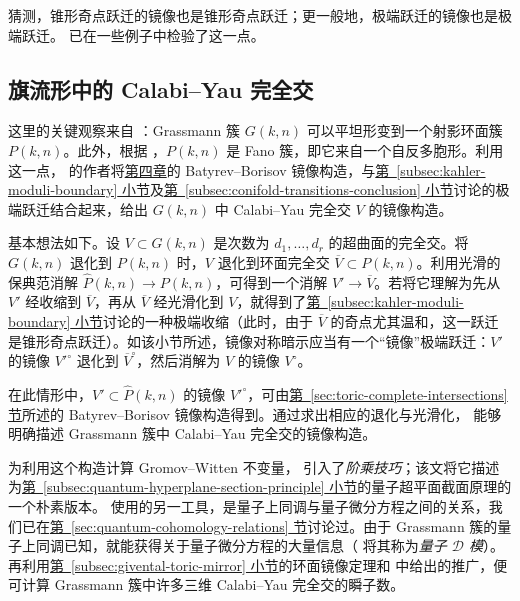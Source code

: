  猜测，锥形奇点跃迁的镜像也是锥形奇点跃迁；更一般地，极端跃迁的镜像也是极端跃迁。 已在一些例子中检验了这一点。

\subsection{旗流形中的 Calabi--Yau 完全交}\label{subsec:flag-cy-complete-intersections}
这里的关键观察来自 ：Grassmann 簇 $G(k,n)$ 可以平坦形变到一个射影环面簇 $P(k,n)$。此外，根据 ，$P(k,n)$ 是 Fano 簇，即它来自一个自反多胞形。利用这一点， 的作者将\hyperref[chap:mirror-constructions]{第四章}的 Batyrev--Borisov 镜像构造，与\hyperref[subsec:kahler-moduli-boundary]{第~\ref*{subsec:kahler-moduli-boundary} 小节}及\hyperref[subsec:conifold-transitions-conclusion]{第~\ref*{subsec:conifold-transitions-conclusion} 小节}讨论的极端跃迁结合起来，给出 $G(k,n)$ 中 Calabi--Yau 完全交 $V$ 的镜像构造。

基本想法如下。设 $V\subset G(k,n)$ 是次数为 $d_1,\ldots,d_r$ 的超曲面的完全交。将 $G(k,n)$ 退化到 $P(k,n)$ 时，$V$ 退化到环面完全交 $\overline V\subset P(k,n)$。利用光滑的保典范消解 $\widehat P(k,n)\to P(k,n)$，可得到一个消解 $V'\to\overline V$。若将它理解为先从 $V'$ 经收缩到 $\overline V$，再从 $\overline V$ 经光滑化到 $V$，就得到了\hyperref[subsec:kahler-moduli-boundary]{第~\ref*{subsec:kahler-moduli-boundary} 小节}讨论的一种极端收缩（此时，由于 $\overline V$ 的奇点尤其温和，这一跃迁是锥形奇点跃迁）。如该小节所述，镜像对称暗示应当有一个“镜像”极端跃迁：$V'$ 的镜像 $V'^\circ$ 退化到 $\overline V^\circ$，然后消解为 $V$ 的镜像 $V^\circ$。

在此情形中，$V'\subset\widehat P(k,n)$ 的镜像 $V'^\circ$，可由\hyperref[sec:toric-complete-intersections]{第~\ref*{sec:toric-complete-intersections} 节}所述的 Batyrev--Borisov 镜像构造得到。通过求出相应的退化与光滑化， 能够明确描述 Grassmann 簇中 Calabi--Yau 完全交的镜像构造。

为利用这个构造计算 Gromov--Witten 不变量， 引入了\emph{阶乘技巧}；该文将它描述为\hyperref[subsec:quantum-hyperplane-section-principle]{第~\ref*{subsec:quantum-hyperplane-section-principle} 小节}的量子超平面截面原理的一个朴素版本。 使用的另一工具，是量子上同调与量子微分方程之间的关系，我们已在\hyperref[sec:quantum-cohomology-relations]{第~\ref*{sec:quantum-cohomology-relations} 节}讨论过。由于 Grassmann 簇的量子上同调已知，就能获得关于量子微分方程的大量信息（ 将其称为\emph{量子 $\mathcal D$ 模}）。再利用\hyperref[subsec:givental-toric-mirror]{第~\ref*{subsec:givental-toric-mirror} 小节}的环面镜像定理和  中给出的推广，便可计算 Grassmann 簇中许多三维 Calabi--Yau 完全交的瞬子数。

